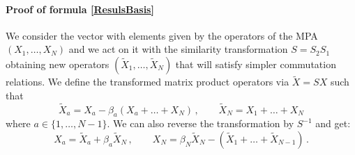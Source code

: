 \documentclass[10pt]{article}
\numberwithin{equation}{section}
\numberwithin{equation}{subsection}
\newcommand{\Xt}{\widetilde{X}}
\newcommand{\co}{\;,}
\newcommand{\dt}{\;.}
\begin{document}
\paragraph{Proof of formula \eqref{ResulsBasis}}  
We consider the vector with elements given by the operators of the MPA $(X_{1},\ldots,X_{N})$ and we act on it with the similarity transformation $S=S_{2}S_{1}$ obtaining new operators $(\Xt_{1},\ldots,\Xt_{N})$ that will satisfy simpler commutation relations. 
We define the transformed matrix product operators
via $\tilde X=S X$ such that
\begin{equation}\label{Xtildes2b}
 \tilde X_a=X_{a}-\beta_{a}(X_{a}+\ldots+X_{N})\,,\qquad \tilde X_N= 
				X_{1}+\ldots +X_{N}
\end{equation} 
where  $ a\in \{1,\ldots,N-1\}$.
% 
We can also reverse the transformation by $S^{-1}$ and get: 
\begin{equation}\label{Xes}
 X_{a}=	\Xt_{a}+\beta_{a}\Xt_{N}\,,\qquad
	X_{N} = \beta_N\Xt_{N}-(\Xt_{1}+\ldots+\Xt_{N-1})\,.
\end{equation}
\end{document}
